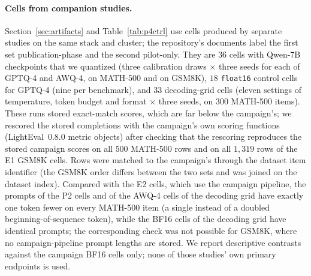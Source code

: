 \documentclass[11pt,a4paper]{article}
\begin{document}
\paragraph{Cells from companion studies.} Section~\ref{sec:artifacts} and Table~\ref{tab:p4ctrl} use cells produced by separate studies on the same stack and cluster; the repository's documents label the first set publication-phase and the second pilot-only. They are $36$ cells with Qwen-7B checkpoints that we quantized (three calibration draws $\times$ three seeds for each of GPTQ-4 and AWQ-4, on MATH-500 and on GSM8K), $18$ \texttt{float16} control cells for GPTQ-4 (nine per benchmark), and $33$ decoding-grid cells (eleven settings of temperature, token budget and format $\times$ three seeds, on $300$ MATH-500 items). These runs stored exact-match scores, which are far below the campaign's; we rescored the stored completions with the campaign's own scoring functions (LightEval~0.8.0 metric objects) after checking that the rescoring reproduces the stored campaign scores on all $500$ MATH-500 rows and on all $1{,}319$ rows of the E1 GSM8K cells. Rows were matched to the campaign's through the dataset item identifier (the GSM8K order differs between the two sets and was joined on the dataset index). Compared with the E2 cells, which use the campaign pipeline, the prompts of the P2 cells and of the AWQ-4 cells of the decoding grid have exactly one token fewer on every MATH-500 item (a single instead of a doubled beginning-of-sequence token), while the BF16 cells of the decoding grid have identical prompts; the corresponding check was not possible for GSM8K, where no campaign-pipeline prompt lengths are stored. We report descriptive contrasts against the campaign BF16 cells only; none of those studies' own primary endpoints is used.


\end{document}
